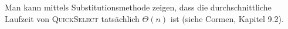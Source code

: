 \documentclass[11pt,a4paper]{article}
\begin{document}
\begin{loesung}
\begin{enumerate}
        Man kann mittels Substitutionsmethode zeigen, dass die durchschnittliche Laufzeit von \textsc{QuickSelect} tatsächlich $\Theta(n)$ ist (siehe Cormen, Kapitel 9.2).
    \end{enumerate}
\end{loesung}
\end{document}
